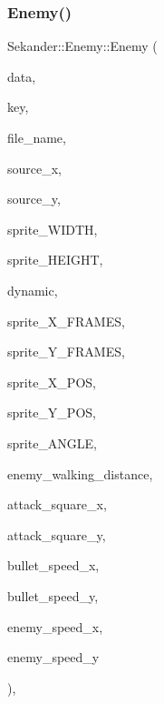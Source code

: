 \mbox{\label{classSekander_1_1Enemy_aa5be2d2f7c44b05ed64686363b465bab}} 
\subsubsection{\texorpdfstring{Enemy()}{Enemy()}\hspace{0.1cm}{\footnotesize\ttfamily [2/2]}}
{\footnotesize\ttfamily Sekander\+::\+Enemy\+::\+Enemy (\begin{DoxyParamCaption}\item[{\hyperlink{namespaceSekander_a1d69b002ba2d23020901c28f0def5e16}{Game\+Data\+Ref}}]{data,  }\item[{std\+::string}]{key,  }\item[{std\+::string}]{file\+\_\+name,  }\item[{int}]{source\+\_\+x,  }\item[{int}]{source\+\_\+y,  }\item[{int}]{sprite\+\_\+\+W\+I\+D\+TH,  }\item[{int}]{sprite\+\_\+\+H\+E\+I\+G\+HT,  }\item[{bool}]{dynamic,  }\item[{int}]{sprite\+\_\+\+X\+\_\+\+F\+R\+A\+M\+ES,  }\item[{int}]{sprite\+\_\+\+Y\+\_\+\+F\+R\+A\+M\+ES,  }\item[{float}]{sprite\+\_\+\+X\+\_\+\+P\+OS,  }\item[{float}]{sprite\+\_\+\+Y\+\_\+\+P\+OS,  }\item[{float}]{sprite\+\_\+\+A\+N\+G\+LE,  }\item[{int}]{enemy\+\_\+walking\+\_\+distance,  }\item[{float}]{attack\+\_\+square\+\_\+x,  }\item[{float}]{attack\+\_\+square\+\_\+y,  }\item[{float}]{bullet\+\_\+speed\+\_\+x,  }\item[{float}]{bullet\+\_\+speed\+\_\+y,  }\item[{float}]{enemy\+\_\+speed\+\_\+x,  }\item[{float}]{enemy\+\_\+speed\+\_\+y }\end{DoxyParamCaption})\hspace{0.3cm}{\ttfamily [inline]}, {\ttfamily [explicit]}}



